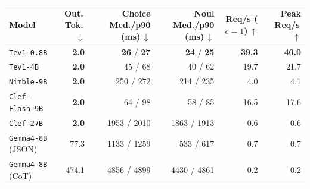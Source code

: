 \begin{tabular}{lrrrrr}
\toprule
Model & Out.\,Tok.\,$\downarrow$ & Choice Med./p90 (ms)\,$\downarrow$ & Noul Med./p90 (ms)\,$\downarrow$ & Req/s ($c=1$)\,$\uparrow$ & Peak Req/s\,$\uparrow$ \\
\midrule
\texttt{Tev1-0.8B} & \textbf{2.0} & \textbf{26} / \textbf{27} & \textbf{24} / \textbf{25} & \textbf{39.3} & \textbf{40.0} \\
\texttt{Tev1-4B} & \textbf{2.0} & 45 / 68 & 40 / 62 & 19.7 & 21.7 \\
\texttt{Nimble-9B} & \textbf{2.0} & 250 / 272 & 214 / 235 & 4.0 & 4.1 \\
\texttt{Clef-Flash-9B} & \textbf{2.0} & 64 / 98 & 58 / 85 & 16.5 & 17.6 \\
\texttt{Clef-27B} & \textbf{2.0} & 1953 / 2010 & 1863 / 1913 & 0.6 & 0.6 \\
\midrule
\texttt{Gemma4-8B} (JSON) & 77.3 & 1133 / 1259 & 533 / 617 & 0.7 & 0.7 \\
\texttt{Gemma4-8B} (CoT) & 474.1 & 4856 / 4899 & 4430 / 4861 & 0.2 & 0.2 \\
\bottomrule
\end{tabular}
